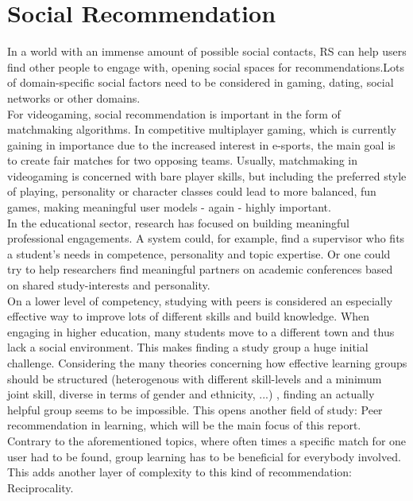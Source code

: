 \documentclass[nochapterpage,bigchapter,linedtoc,longdoc,colorback,accentcolor=tud3b,oneside]{tudreport}
\begin{document}
\section{Social Recommendation}\label{rw:socialrec}
In a world with an immense amount of possible social contacts, RS can help users find other people to engage with, opening social spaces for recommendations.Lots of domain-specific social factors need to be considered in gaming, dating, social networks or other domains.\\ 
For videogaming, social recommendation is important in the form of matchmaking algorithms. In competitive multiplayer gaming, which is currently gaining in importance due to the increased interest in e-sports, the main goal is to create fair matches for two opposing teams. Usually, matchmaking in videogaming is concerned with bare player skills, but including the preferred style of playing, personality or character classes could lead to more balanced, fun games, making meaningful user models - again - highly important.\\
In the educational sector, research has focused on building meaningful professional engagements. A system could, for example, find a supervisor who fits a student's needs in competence, personality and topic expertise. \cite{zhang2016personality} Or one could try to help researchers find meaningful partners on academic conferences based on shared study-interests and personality. \cite{asabere2017improving}\\
On a lower level of competency, studying with peers is considered an especially effective way to improve lots of different skills and build knowledge. \cite{maxwell2008learning} When engaging in higher education, many students move to a different town and thus lack a social environment. This makes finding a study group a huge initial challenge. Considering the many theories concerning how effective learning groups should be structured (heterogenous with different skill-levels and a minimum joint skill, diverse in terms of gender and ethnicity, ...) \cite{manske2015using, blumenfeld1996learning}, finding an actually helpful group seems to be impossible. This opens another field of study: Peer recommendation in learning, which will be the main focus of this report. \cite{potts2018reciprocal, olakanmi2017group}\\
Contrary to the aforementioned topics, where often times a specific match for one user had to be found, group learning has to be beneficial for everybody involved. This adds another layer of complexity to this kind of recommendation: Reciprocality.\\
\end{document}
